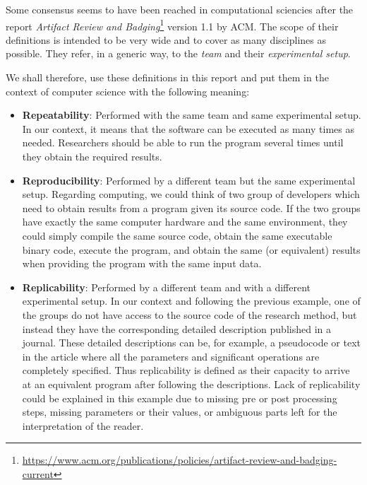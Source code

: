 Some consensus seems to have been reached in computational sciencies after the report \textit{Artifact Review and Badging}\footnote{\url{https://www.acm.org/publications/policies/artifact-review-and-badging-current}} version 1.1 by ACM. The scope of their definitions is intended to be very wide and to cover as many disciplines as possible. They refer, in a generic way, to the \textit{team} and their \textit{experimental setup}.

We shall therefore, use these definitions in this report and put them in the context of computer science with the following meaning:

\begin{itemize}
    \item \textbf{Repeatability}: Performed with the same team and same experimental setup. In our context, it means that the software can be executed as many times as needed. Researchers should be able to run the program several times until they obtain the required results.
    
    \item \textbf{Reproducibility}: Performed by a different team but the same experimental setup. Regarding computing, we could think of two group of developers which need to obtain results from a program given its source code. If the two groups have exactly the same computer hardware and the same environment, they could simply compile the same source code, obtain the same executable binary code, execute the program, and obtain the same (or equivalent) results when providing the program with the same input data.

    \item \textbf{Replicability}: Performed by a different team and with a different experimental setup. In our context and following the previous example, one of the groups do not have access to the source code of the research method, but instead they have the corresponding detailed description published in a journal. These detailed descriptions can be, for example, a pseudocode or text in the article where all the parameters and significant operations are completely specified. Thus replicability is defined as their capacity to arrive at an equivalent program after following the descriptions. Lack of replicability could be explained in this example due to missing pre or post processing steps, missing parameters or their values, or ambiguous parts left for the interpretation of the reader.
\end{itemize}

